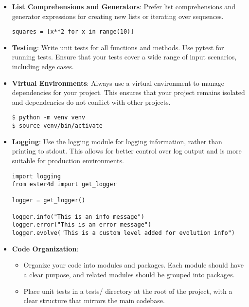 \documentclass{ol-softwaremanual}
\begin{document}
\begin{itemize}
\item \textbf{List Comprehensions and Generators}: 
    Prefer list comprehensions and generator expressions for creating new lists or iterating over sequences.

\begin{example}
\begin{verbatim}
squares = [x**2 for x in range(10)]
\end{verbatim}
\end{example}

\item \textbf{Testing}: Write unit tests for all functions and methods. Use pytest for running tests. Ensure that your tests cover a wide range of input scenarios, including edge cases.

\item \textbf{Virtual Environments}:
        Always use a virtual environment to manage dependencies for your project. This ensures that your project remains isolated and dependencies do not conflict with other projects.
\begin{terminal}
\begin{verbatim}
$ python -m venv venv
$ source venv/bin/activate
\end{verbatim}
\end{terminal}

\item \textbf{Logging}: Use the logging module for logging information, rather than printing to stdout. This allows for better control over log output and is more suitable for production environments.
\begin{example}
\begin{verbatim}
import logging
from ester4d import get_logger

logger = get_logger()

logger.info("This is an info message")
logger.error("This is an error message")
logger.evolve("This is a custom level added for evolution info")
\end{verbatim}
\end{example}
\item \textbf{Code Organization}:
\begin{itemize}
        \item Organize your code into modules and packages. Each module should have a clear purpose, and related modules should be grouped into packages.
        \item Place unit tests in a tests/ directory at the root of the project, with a clear structure that mirrors the main codebase.
\end{itemize}

\end{itemize}
\end{document}

